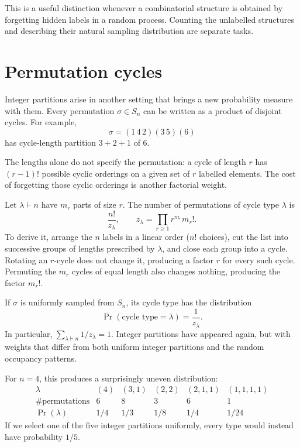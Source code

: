 This is a useful distinction whenever a combinatorial structure is obtained by forgetting hidden labels in a random process. Counting the unlabelled structures and describing their natural sampling distribution are separate tasks.

\section{Permutation cycles}

Integer partitions arise in another setting that brings a new probability measure with them. Every permutation \(\sigma\in S_n\) can be written as a product of disjoint cycles. For example,
\[
 \sigma=(1\,4\,2)(3\,5)(6)
\]
has cycle-length partition \(3+2+1\) of \(6\).

The lengths alone do not specify the permutation: a cycle of length \(r\) has \((r-1)!\) possible cyclic orderings on a given set of \(r\) labelled elements. The cost of forgetting those cyclic orderings is another factorial weight.

Let \(\lambda\vdash n\) have \(m_r\) parts of size \(r\). The number of permutations of cycle type \(\lambda\) is
\[
 \boxed{\frac{n!}{z_\lambda},
 \qquad z_\lambda=\prod_{r\ge1}r^{m_r}m_r!.}
\]
To derive it, arrange the \(n\) labels in a linear order (\(n!\) choices), cut the list into successive groups of lengths prescribed by \(\lambda\), and close each group into a cycle. Rotating an \(r\)-cycle does not change it, producing a factor \(r\) for every such cycle. Permuting the \(m_r\) cycles of equal length also changes nothing, producing the factor \(m_r!\).

If \(\sigma\) is uniformly sampled from \(S_n\), its cycle type has the distribution
\[
 \boxed{\Pr(\text{cycle type}=\lambda)=\frac1{z_\lambda}.}
\]
In particular, \(\sum_{\lambda\vdash n}1/z_\lambda=1\). Integer partitions have appeared again, but with weights that differ from both uniform integer partitions and the random occupancy patterns.

For \(n=4\), this produces a surprisingly uneven distribution:
\[
\begin{array}{c|ccccc}
 \lambda&(4)&(3,1)&(2,2)&(2,1,1)&(1,1,1,1)\\ \hline
 \#\text{permutations}&6&8&3&6&1\\
 \Pr(\lambda)&1/4&1/3&1/8&1/4&1/24
\end{array}
\]
If we select one of the five integer partitions uniformly, every type would instead have probability \(1/5\).


